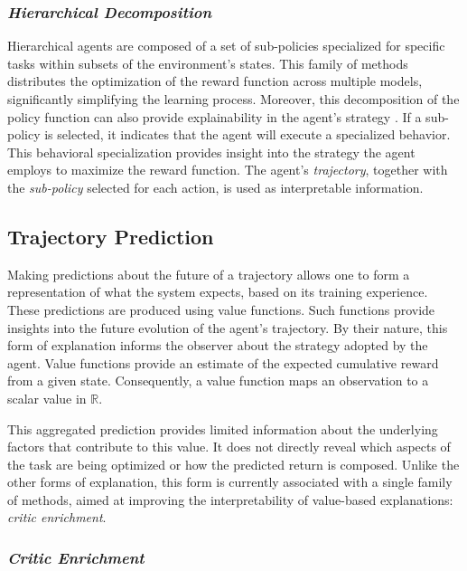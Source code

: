\subsubsection{\textit{Hierarchical Decomposition}}
\label{subsubsec:hierarchical_decomposition}

Hierarchical agents are composed of a set of sub-policies specialized for specific tasks within subsets of the environment's states.
This family of methods distributes the optimization of the reward function across multiple models, significantly simplifying the learning process.
Moreover, this decomposition of the policy function can also provide explainability in the agent's strategy \parencite{Beyret_2019}.
If a sub-policy is selected, it indicates that the agent will execute a specialized behavior.
This behavioral specialization provides insight into the strategy the agent employs to maximize the reward function.
The agent's \textit{trajectory}, together with the \textit{sub-policy} selected for each action, is used as interpretable information.

\subsection{Trajectory Prediction}
\label{subsec:trajectory_prediction}

Making predictions about the future of a trajectory allows one to form a representation of what the system expects, based on its training experience.
These predictions are produced using value functions.
Such functions provide insights into the future evolution of the agent's trajectory.
By their nature, this form of explanation informs the observer about the strategy adopted by the agent.
Value functions provide an estimate of the expected cumulative reward from a given state.
Consequently, a value function maps an observation to a scalar value in $\mathbb{R}$.

This aggregated prediction provides limited information about the underlying factors that contribute to this value.
It does not directly reveal which aspects of the task are being optimized or how the predicted return is composed.
Unlike the other forms of explanation, this form is currently associated with a single family of methods, aimed at improving the interpretability of value-based explanations: \textit{critic enrichment}.

\subsubsection*{\textit{Critic Enrichment}}
\label{subsubsec:critic_enrichment}

